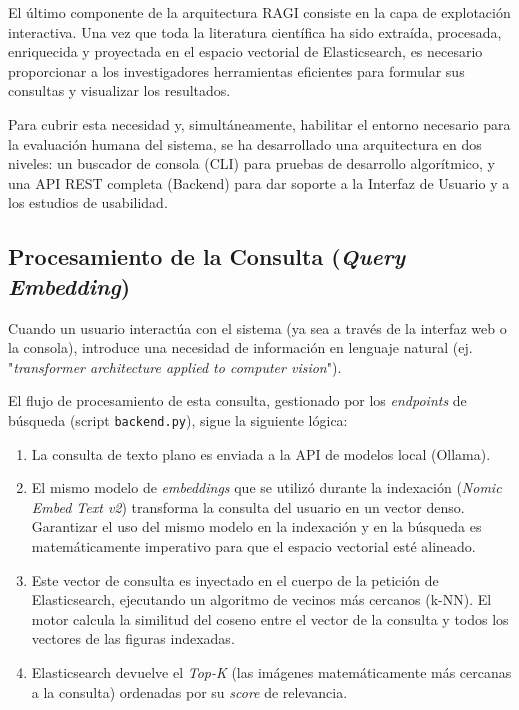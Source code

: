 \documentclass[a4paper]{report}
\begin{document}
El último componente de la arquitectura RAGI consiste en la capa de explotación interactiva. Una vez que toda la literatura científica ha sido extraída, procesada, enriquecida y proyectada en el espacio vectorial de Elasticsearch, es necesario proporcionar a los investigadores herramientas eficientes para formular sus consultas y visualizar los resultados. 

Para cubrir esta necesidad y, simultáneamente, habilitar el entorno necesario para la evaluación humana del sistema, se ha desarrollado una arquitectura en dos niveles: un buscador de consola (CLI) para pruebas de desarrollo algorítmico, y una API REST completa (Backend) para dar soporte a la Interfaz de Usuario y a los estudios de usabilidad.

\subsection{Procesamiento de la Consulta (\textit{Query Embedding})}

Cuando un usuario interactúa con el sistema (ya sea a través de la interfaz web o la consola), introduce una necesidad de información en lenguaje natural (ej. "\textit{transformer architecture applied to computer vision}"). 

El flujo de procesamiento de esta consulta, gestionado por los \textit{endpoints} de búsqueda (script \texttt{backend.py}), sigue la siguiente lógica:
\begin{enumerate}
    \item La consulta de texto plano es enviada a la API de modelos local (Ollama).
    \item El mismo modelo de \textit{embeddings} que se utilizó durante la indexación (\textit{Nomic Embed Text v2}) transforma la consulta del usuario en un vector denso. Garantizar el uso del mismo modelo en la indexación y en la búsqueda es matemáticamente imperativo para que el espacio vectorial esté alineado.
    \item Este vector de consulta es inyectado en el cuerpo de la petición de Elasticsearch, ejecutando un algoritmo de vecinos más cercanos (k-NN). El motor calcula la similitud del coseno entre el vector de la consulta y todos los vectores de las figuras indexadas.
    \item Elasticsearch devuelve el \textit{Top-K} (las imágenes matemáticamente más cercanas a la consulta) ordenadas por su \textit{score} de relevancia.
\end{enumerate}
\end{document}
